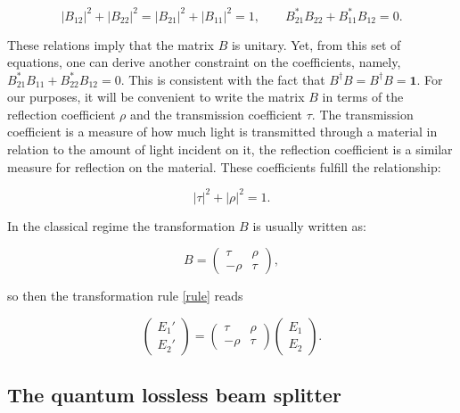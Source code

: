 \documentclass[12pt]{book}
\begin{document}
\begin{equation}
|B_{12}|^{2}+|B_{22}|^{2}=|B_{21}|^{2}+|B_{11}|^{2}=1,\qquad B_{21}^{*} B_{22}+B_{11}^{*} B_{12}=0.
\end{equation}

These relations imply that the matrix $B$ is unitary. Yet, from this set of equations, one can derive another constraint on the coefficients, namely, $B_{21}^{*} B_{11}+B_{22}^{*} B_{12}=0$. This is consistent with the fact that $B^{\dagger}B=B^{\dagger}B= \mathbf{1}$. For our purposes, it will be convenient to write the matrix $B$ in terms of the reflection coefficient $\rho$ and the transmission coefficient $\tau$. The transmission coefficient is a measure of how much light is transmitted through a material in relation to the amount of light incident on it, the reflection coefficient is a similar measure for reflection on the material. These coefficients fulfill the relationship:

\begin{equation}
|\tau|^{2}+|\rho|^{2}=1.
\end{equation}
 
 In the classical regime the transformation $B$ is usually written as:
 
 \begin{equation}
 B=\begin{pmatrix} \tau & \rho \\ -\rho & \tau \end{pmatrix},
 \end{equation}


so then the transformation rule \ref{rule} reads

\begin{equation}
\begin{pmatrix} E_{1}' \\ E_{2}' \end{pmatrix}=\begin{pmatrix} \tau & \rho \\ -\rho & \tau \end{pmatrix} \begin{pmatrix} E_{1} \\ E_{2} \end{pmatrix}.
\end{equation}




\subsection{The quantum lossless beam splitter}
\end{document}
